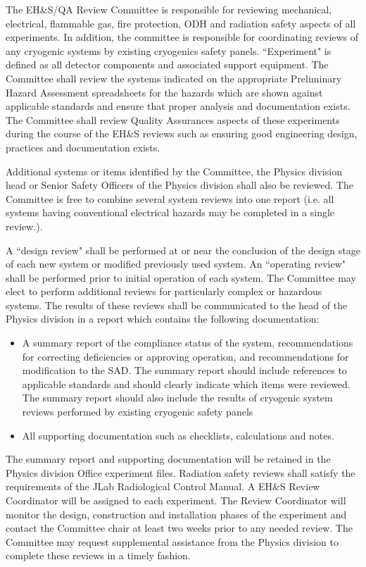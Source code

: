 %
%

The EH\&S/QA Review Committee is responsible for reviewing mechanical, electrical, 
flammable gas, fire protection, ODH and radiation safety aspects of all experiments. In 
addition, the committee is responsible for coordinating reviews of any cryogenic systems 
by existing cryogenics safety panels. ``Experiment" is defined as all detector components 
and associated support equipment. The Committee shall review the systems indicated on 
the appropriate Preliminary Hazard Assessment spreadsheets for the hazards which are 
shown against applicable standards and ensure that proper analysis and documentation
exists. The Committee shall review Quality Assurances aspects of these experiments 
during the course of the EH\&S reviews such as ensuring good engineering design, 
practices and documentation exists.

Additional systems or items identified by the Committee, the Physics division head or 
Senior Safety Officers of the Physics division shall also be reviewed.  The Committee is 
free to combine several system reviews into one report (i.e. all systems having 
conventional electrical hazards may be completed in a single review.).

A ``design review" shall be performed at or near the conclusion of the design stage of each 
new system or modified previously used system. An ``operating review" shall be 
performed prior to initial operation of each system. The Committee may elect to perform 
additional reviews for particularly complex or hazardous systems. The results of these 
reviews shall be communicated to the head of the Physics division in a report which 
contains the following documentation:


\begin{itemize}
\item A summary report of the compliance status of the system, recommendations for  
correcting deficiencies or approving operation, and recommendations for modification to 
the SAD. The summary report should include references to applicable standards and 
should clearly indicate which items were reviewed. The summary report should also 
include the results of cryogenic system reviews performed by existing cryogenic safety 
panels


\item All supporting documentation such as checklists, calculations and notes.
\end{itemize}

	The summary report and supporting documentation will be retained in the Physics 
division Office experiment files. Radiation safety reviews shall satisfy the requirements 
of the JLab Radiological Control Manual. A EH\&S Review Coordinator will be 
assigned to each experiment. The Review Coordinator will monitor the design, 
construction and installation phases of the experiment and contact the Committee chair at 
least two weeks prior to any needed review. The Committee may request supplemental 
assistance from the Physics division to complete these reviews in a timely fashion.



